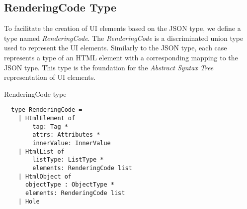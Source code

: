 \subsection{RenderingCode Type}
To facilitate the creation of UI elements based on the JSON type, we define a type named \emph{RenderingCode}.
The \emph{RenderingCode} is a discriminated union type used to represent the UI elements.
Similarly to the JSON type, each case represents a type of an HTML element with a corresponding mapping to the JSON type.
This type is the foundation for the \emph{Abstract Syntax Tree} representation of UI elements.
\begin{listing}[h]
	\caption {RenderingCode type}
	\begin{lstlisting}
  type RenderingCode =
    | HtmlElement of
        tag: Tag *
        attrs: Attributes *
        innerValue: InnerValue
    | HtmlList of
        listType: ListType *
        elements: RenderingCode list
    | HtmlObject of
      objectType : ObjectType *
      elements: RenderingCode list
    | Hole
  \end{lstlisting}
\end{listing}

